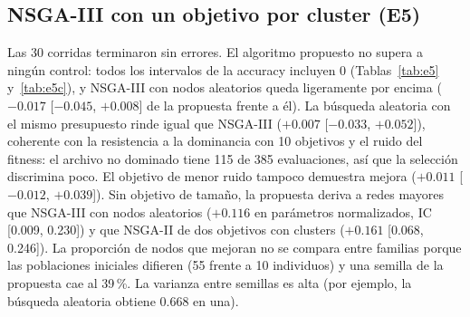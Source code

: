 \documentclass[11pt,a4paper]{article}
\begin{document}
\subsection{NSGA-III con un objetivo por cluster (E5)}\label{sec:e5}
Las 30 corridas terminaron sin errores. El algoritmo propuesto no supera a ningún control: todos los intervalos de la accuracy incluyen 0 (Tablas~\ref{tab:e5} y~\ref{tab:e5c}), y NSGA-III con nodos aleatorios queda ligeramente por encima ($-0.017$ [$-0.045$, $+0.008$] de la propuesta frente a él). La búsqueda aleatoria con el mismo presupuesto rinde igual que NSGA-III ($+0.007$ [$-0.033$, $+0.052$]), coherente con la resistencia a la dominancia con 10 objetivos y el ruido del fitness: el archivo no dominado tiene 115 de 385 evaluaciones, así que la selección discrimina poco. El objetivo de menor ruido tampoco demuestra mejora ($+0.011$ [$-0.012$, $+0.039$]). Sin objetivo de tamaño, la propuesta deriva a redes mayores que NSGA-III con nodos aleatorios ($+0.116$ en parámetros normalizados, IC [0.009, 0.230]) y que NSGA-II de dos objetivos con clusters ($+0.161$ [0.068, 0.246]). La proporción de nodos que mejoran no se compara entre familias porque las poblaciones iniciales difieren (55 frente a 10 individuos) y una semilla de la propuesta cae al 39\,\%. La varianza entre semillas es alta (por ejemplo, la búsqueda aleatoria obtiene 0.668 en una).


\end{document}
